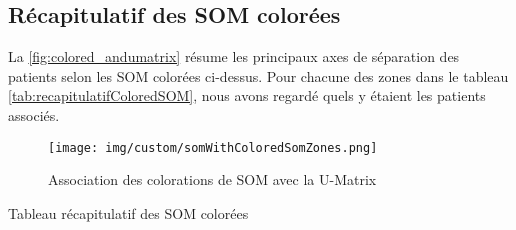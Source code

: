 \subsection{Récapitulatif des SOM colorées}
    
    La \autoref{fig:colored_andumatrix} résume les principaux axes de séparation des patients selon les SOM colorées ci-dessus. Pour chacune des zones dans le tableau \autoref{tab:recapitulatifColoredSOM}, nous avons regardé quels y étaient les patients associés.

    \begin{figure}[H]
        \centering
        \texttt{[image: img/custom/somWithColoredSomZones.png]}    
        \caption{Association des colorations de SOM avec la U-Matrix}
        \label{fig:colored_andumatrix}
    \end{figure}

    \begin{table}[H]
        \centering
        
        \caption{Tableau récapitulatif des SOM colorées}
        \label{tab:recapitulatifColoredSOM}
    \end{table}


